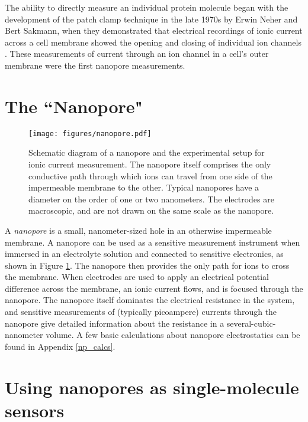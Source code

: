 The ability to directly measure an individual protein molecule began with the development of the patch clamp technique in the late 1970s by Erwin Neher and Bert Sakmann, when they demonstrated that electrical recordings of ionic current across a cell membrane showed the opening and closing of individual ion channels \citep{Neher1976}.  These measurements of current through an ion channel in a cell's outer membrane were the first nanopore measurements.

\section{The ``Nanopore"}

\begin{figure}[h]
\begin{centering}
\texttt{[image: figures/nanopore.pdf]}
\caption[The nanopore setup]{Schematic diagram of a nanopore and the experimental setup for ionic current measurement.  The nanopore itself comprises the only conductive path through which ions can travel from one side of the impermeable membrane to the other.  Typical nanopores have a diameter on the order of one or two nanometers.  The electrodes are macroscopic, and are not drawn on the same scale as the nanopore.}
\label{fig:nanopore}
\end{centering}
\end{figure}

A \textit{nanopore} is a small, nanometer-sized hole in an otherwise impermeable membrane.  A nanopore can be used as a sensitive measurement instrument when immersed in an electrolyte solution and connected to sensitive electronics, as shown in Figure \ref{fig:nanopore}.  The nanopore then provides the only path for ions to cross the membrane.  When electrodes are used to apply an electrical potential difference across the membrane, an ionic current flows, and is focused through the nanopore.  The nanopore itself dominates the electrical resistance in the system, and sensitive measurements of (typically picoampere) currents through the nanopore give detailed information about the resistance in a several-cubic-nanometer volume.  A few basic calculations about nanopore electrostatics can be found in Appendix \ref{np_calcs}.

\section{Using nanopores as single-molecule sensors}

